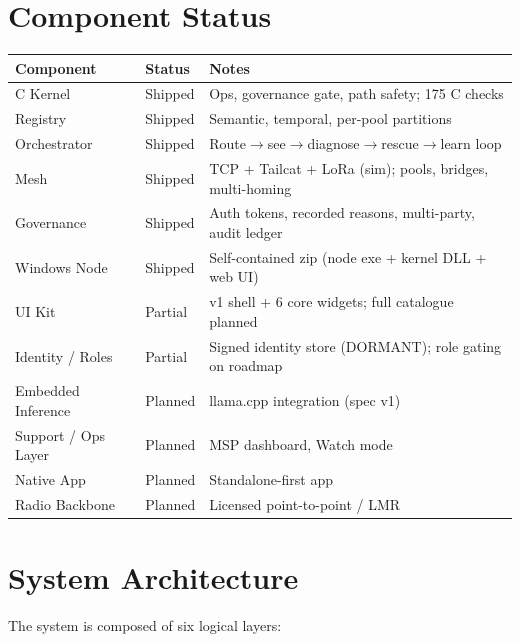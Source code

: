 \documentclass[11pt,a4paper]{article}
\newcommand{\shipped}{Shipped}
\newcommand{\partialstatus}{Partial}
\newcommand{\planned}{Planned}
\begin{document}
\section{Component Status}
\begin{center}
\begin{tabularx}{\textwidth}{l l X}
\toprule
\textbf{Component} & \textbf{Status} & \textbf{Notes} \\
\midrule
C Kernel & \shipped & Ops, governance gate, path safety; 175 C checks \\
Registry & \shipped & Semantic, temporal, per-pool partitions \\
Orchestrator & \shipped & Route$\rightarrow$see$\rightarrow$diagnose$\rightarrow$rescue$\rightarrow$learn loop \\
Mesh & \shipped & TCP + Tailcat + LoRa (sim); pools, bridges, multi-homing \\
Governance & \shipped & Auth tokens, recorded reasons, multi-party, audit ledger \\
Windows Node & \shipped & Self-contained zip (node exe + kernel DLL + web UI) \\
UI Kit & \partialstatus & v1 shell + 6 core widgets; full catalogue planned \\
Identity / Roles & \partialstatus & Signed identity store (DORMANT); role gating on roadmap \\
Embedded Inference & \planned & llama.cpp integration (spec v1) \\
Support / Ops Layer & \planned & MSP dashboard, Watch mode \\
Native App & \planned & Standalone-first app \\
Radio Backbone & \planned & Licensed point-to-point / LMR \\
\bottomrule
\end{tabularx}
\end{center}

\section{System Architecture}
The system is composed of six logical layers:
\end{document}
